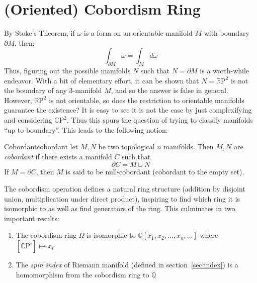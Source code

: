 \documentclass{book}
\newcommand{\Q}{{\mathbb{Q}}}
\newcommand{\CP}{{\mathbb{C}\mathrm{P}}}
\newcommand{\RP}{{\mathbb{R}\mathrm{P}}}
\newcommand{\dcup}{\sqcup}
\begin{document}
%

\section{(Oriented) Cobordism Ring}\label{sec:pontryaginNum}

By Stoke's Theorem, if $\omega$ is a form on an orientable manifold $M$ with boundary $\partial M$, then:
\[
  \int_{\partial M} \omega = \int_M d\omega
\]
Thus, figuring out the possible manifolds $N$ such that $N = \partial M$ is a worth-while endeavor. With a bit
of elementary effort, it can be shown that $N = \RP^2$ is not the boundary of any $3$-manifold $M$, and so the
answer is false in general. However, $\RP^2$ is not orientable, so does the restriction to orientable
manifolds guarantee the existence? It is easy to see it is not the case by just complexifying and considering
$\CP^2$. Thus this spurs the question of trying to classify manifolds ``up to boundary''. This leads to the
following notion:

\begin{defn}{Cobordant}{cobordant}
  let $M,N$ be two topological $n$ manifolds. Then $M,N$ are \emph{cobordant} if there exists a manifold $C$
  such that
  \[
    \partial C = M \dcup N
  \]
  If $M = \partial C$, then $M$ is said to be null-cobordant (cobordant to the empty set).
\end{defn}

The cobordism operation defines a natural ring structure (addition by disjoint union, multiplication under direct
product), inspiring to find which ring it is isomorphic to as
well as find generators of the ring. This culminates in two important results:
\begin{enumerate}
  \item The cobordism ring $\Omega$ is isomorphic to $\Q[x_1, x_2, ..., x_n, ...]$ where $[\CP^i] \mapsto x_i$
  \item The \emph{spin index} of Riemann manifold (defined in section~\ref{sec:index}) is a homomorphism from
    the cobordism ring to $\Q$
\end{enumerate}
\end{document}
